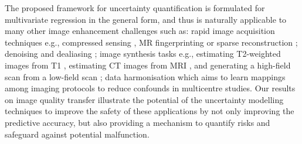 
The proposed framework for uncertainty quantification is formulated for multivariate regression in the general form, and thus is naturally applicable to many other image enhancement challenges such as: rapid image acquisition techniques e.g., compressed sensing \cite{sun2016deep}, MR fingerprinting \cite{ma2013magnetic,cohen2018mr} or sparse reconstruction \cite{schlemper2018deep,hammernik2018learning}; denoising \cite{benou2017ensemble} and dealiasing \cite{yang2018dagan,han2018deep}; image synthesis tasks e.g., estimating T2-weighted images from T1 \cite{rousseau2008brain,ye2013modality,jog2015mr}, estimating CT images from MRI \cite{burgos2015robust,bragman2018uncertainty,nie2018medical}, and generating a high-field scan from a low-field scan \cite{bahrami2016convolutional}; data harmonisation
\cite{mirzaalian2016inter,karayumak2018harmonizing,tax2019cross} which aims to learn mappings among imaging protocols to reduce confounds in multicentre studies. Our results on image quality transfer \cite{alexander2017image} illustrate the potential of the uncertainty modelling techniques to improve the safety of these applications by not only improving the predictive accuracy, but also providing a mechanism to quantify risks and safeguard against potential malfunction. 

%


 
% 
% 

